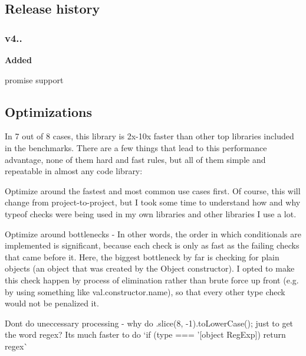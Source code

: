 \subsection*{Release history}

\subsubsection*{v4..}

{\bfseries Added}


\begin{DoxyItemize}
\item {\ttfamily promise} support
\end{DoxyItemize}

\subsection*{Optimizations}

In 7 out of 8 cases, this library is 2x-\/10x faster than other top libraries included in the benchmarks. There are a few things that lead to this performance advantage, none of them hard and fast rules, but all of them simple and repeatable in almost any code library\+:


\begin{DoxyEnumerate}
\item Optimize around the fastest and most common use cases first. Of course, this will change from project-\/to-\/project, but I took some time to understand how and why {\ttfamily typeof} checks were being used in my own libraries and other libraries I use a lot.
\item Optimize around bottlenecks -\/ In other words, the order in which conditionals are implemented is significant, because each check is only as fast as the failing checks that came before it. Here, the biggest bottleneck by far is checking for plain objects (an object that was created by the {\ttfamily Object} constructor). I opted to make this check happen by process of elimination rather than brute force up front (e.\+g. by using something like {\ttfamily val.\+constructor.\+name}), so that every other type check would not be penalized it.
\item Don\textquotesingle{}t do uneccessary processing -\/ why do {\ttfamily .slice(8, -\/1).to\+Lower\+Case();} just to get the word {\ttfamily regex}? It\textquotesingle{}s much faster to do `if (type === '\mbox{[}object Reg\+Exp\mbox{]}\textquotesingle{}) return \textquotesingle{}regex\textquotesingle{}\`{}
\end{DoxyEnumerate}

